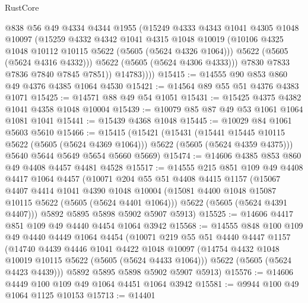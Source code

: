 \begin{lexlean}{RustCore}
\begin{coremodule}
                @838
                @56
                @49
                @4334
                @4344
                @1955
                (@15249
                  @4333
                  @4343
                  @1041
                  @4305
                  @1048
                  @10097
                  (@15259
                    @4332
                    @4342
                    @1041
                    @4315
                    @1048
                    @10019
                    (@10106 @4325 @1048 @10112 @10115 @5622 (@5605 (@5624 @4326 @1064)))
                    @5622
                    (@5605 (@5624 @4316 @4332)))
                  @5622
                  (@5605 (@5624 @4306 @4333)))
                @7830
                @7833
                @7836
                @7840
                @7845
                @7851))
            @14783))))
@15415 := @14555 @90 @853 @860 @49 @4376 @4385 @1064 @4530
@15421 := @14564 @89 @55 @51 @4376 @4383 @1071
@15425 := @14571 @88 @49 @54 @1051
@15431 := @15425 @4375 @4382 @1041 @4358 @1048 @10004
@15439 := @10079 @85 @87 @49 @53 @1061 @1064 @1081 @1041
@15441 := @15439 @4368 @1048
@15445 := @10029 @84 @1061 @5603 @5610
@15466 := @15415
    (@15421
      (@15431
        (@15441 @15445 @10115 @5622 (@5605 (@5624 @4369 @1064)))
        @5622
        (@5605 (@5624 @4359 @4375)))
      @5640
      @5644
      @5649
      @5654
      @5660
      @5669)
@15474 := @14606 @4385 @853 @860 @49 @4408 @4457 @4481 @4528
@15517 := @14555
    @215
    @851
    @109
    @49
    @4408
    @4417
    @1064
    @4457
    (@10071
      @204
      @55
      @51
      @4408
      @4415
      @1157
      (@15067
        @4407
        @4414
        @1041
        @4390
        @1048
        @10004
        (@15081 @4400 @1048 @15087 @10115 @5622 (@5605 (@5624 @4401 @1064)))
        @5622
        (@5605 (@5624 @4391 @4407)))
      @5892
      @5895
      @5898
      @5902
      @5907
      @5913)
@15525 := @14606 @4417 @851 @109 @49 @4440 @4454 @1064 @3942
@15568 := @14555
    @848
    @100
    @109
    @49
    @4440
    @4449
    @1064
    @4454
    (@10071
      @219
      @55
      @51
      @4440
      @4447
      @1157
      (@14740
        @4439
        @4446
        @1041
        @4422
        @1048
        @10097
        (@14754 @4432 @1048 @10019 @10115 @5622 (@5605 (@5624 @4433 @1064)))
        @5622
        (@5605 (@5624 @4423 @4439)))
      @5892
      @5895
      @5898
      @5902
      @5907
      @5913)
@15576 := @14606 @4449 @100 @109 @49 @1064 @4451 @1064 @3942
@15581 := @9944 @100 @49 @1064 @1125 @10153
@15713 := @14401

\end{coremodule}
\end{lexlean}
